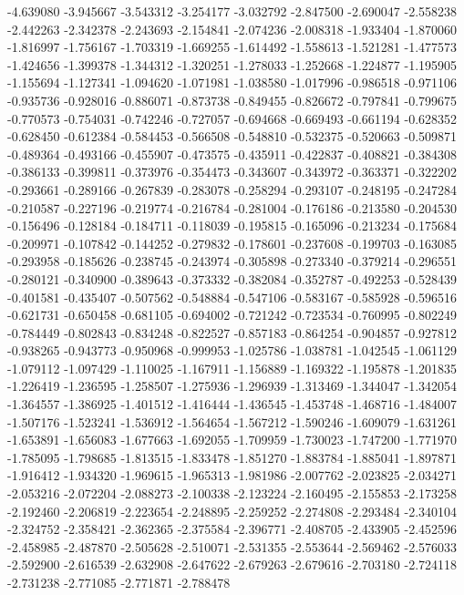 -4.639080
-3.945667
-3.543312
-3.254177
-3.032792
-2.847500
-2.690047
-2.558238
-2.442263
-2.342378
-2.243693
-2.154841
-2.074236
-2.008318
-1.933404
-1.870060
-1.816997
-1.756167
-1.703319
-1.669255
-1.614492
-1.558613
-1.521281
-1.477573
-1.424656
-1.399378
-1.344312
-1.320251
-1.278033
-1.252668
-1.224877
-1.195905
-1.155694
-1.127341
-1.094620
-1.071981
-1.038580
-1.017996
-0.986518
-0.971106
-0.935736
-0.928016
-0.886071
-0.873738
-0.849455
-0.826672
-0.797841
-0.799675
-0.770573
-0.754031
-0.742246
-0.727057
-0.694668
-0.669493
-0.661194
-0.628352
-0.628450
-0.612384
-0.584453
-0.566508
-0.548810
-0.532375
-0.520663
-0.509871
-0.489364
-0.493166
-0.455907
-0.473575
-0.435911
-0.422837
-0.408821
-0.384308
-0.386133
-0.399811
-0.373976
-0.354473
-0.343607
-0.343972
-0.363371
-0.322202
-0.293661
-0.289166
-0.267839
-0.283078
-0.258294
-0.293107
-0.248195
-0.247284
-0.210587
-0.227196
-0.219774
-0.216784
-0.281004
-0.176186
-0.213580
-0.204530
-0.156496
-0.128184
-0.184711
-0.118039
-0.195815
-0.165096
-0.213234
-0.175684
-0.209971
-0.107842
-0.144252
-0.279832
-0.178601
-0.237608
-0.199703
-0.163085
-0.293958
-0.185626
-0.238745
-0.243974
-0.305898
-0.273340
-0.379214
-0.296551
-0.280121
-0.340900
-0.389643
-0.373332
-0.382084
-0.352787
-0.492253
-0.528439
-0.401581
-0.435407
-0.507562
-0.548884
-0.547106
-0.583167
-0.585928
-0.596516
-0.621731
-0.650458
-0.681105
-0.694002
-0.721242
-0.723534
-0.760995
-0.802249
-0.784449
-0.802843
-0.834248
-0.822527
-0.857183
-0.864254
-0.904857
-0.927812
-0.938265
-0.943773
-0.950968
-0.999953
-1.025786
-1.038781
-1.042545
-1.061129
-1.079112
-1.097429
-1.110025
-1.167911
-1.156889
-1.169322
-1.195878
-1.201835
-1.226419
-1.236595
-1.258507
-1.275936
-1.296939
-1.313469
-1.344047
-1.342054
-1.364557
-1.386925
-1.401512
-1.416444
-1.436545
-1.453748
-1.468716
-1.484007
-1.507176
-1.523241
-1.536912
-1.564654
-1.567212
-1.590246
-1.609079
-1.631261
-1.653891
-1.656083
-1.677663
-1.692055
-1.709959
-1.730023
-1.747200
-1.771970
-1.785095
-1.798685
-1.813515
-1.833478
-1.851270
-1.883784
-1.885041
-1.897871
-1.916412
-1.934320
-1.969615
-1.965313
-1.981986
-2.007762
-2.023825
-2.034271
-2.053216
-2.072204
-2.088273
-2.100338
-2.123224
-2.160495
-2.155853
-2.173258
-2.192460
-2.206819
-2.223654
-2.248895
-2.259252
-2.274808
-2.293484
-2.340104
-2.324752
-2.358421
-2.362365
-2.375584
-2.396771
-2.408705
-2.433905
-2.452596
-2.458985
-2.487870
-2.505628
-2.510071
-2.531355
-2.553644
-2.569462
-2.576033
-2.592900
-2.616539
-2.632908
-2.647622
-2.679263
-2.679616
-2.703180
-2.724118
-2.731238
-2.771085
-2.771871
-2.788478
